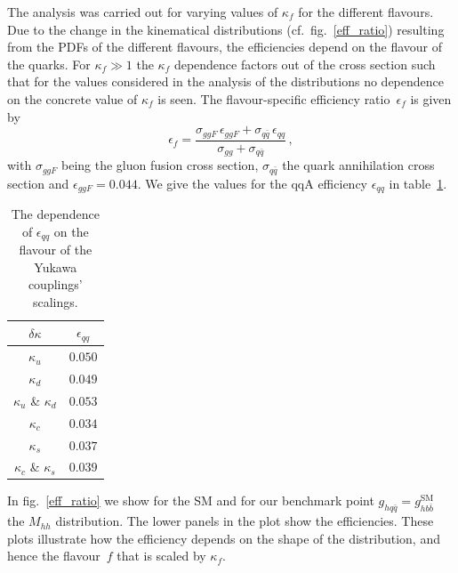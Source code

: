 %
The analysis was carried out for varying values of $\kappa_f$ for the different flavours. Due to the change in the kinematical distributions (cf.~fig.~\ref{eff_ratio}) resulting from the PDFs of the different flavours, the efficiencies depend on the flavour of the quarks.
For $\kappa_f\gg 1$ the $\kappa_f$ dependence factors out of the cross section such that for the values considered in the analysis of the distributions no dependence on the concrete value of $\kappa_f$ is seen. The flavour-specific efficiency ratio~$\epsilon_f$ is given by
\begin{equation}
	\epsilon_f =  \frac{\sigma_{ggF} \, \epsilon_{ggF} + \sigma_{q\bar q}  \, \epsilon_{qq} }{\sigma_{gg} + \sigma_{q\bar q}}\,,
	\label{effrat}
\end{equation}
with $\sigma_{ggF}$ being the gluon fusion cross section, $\sigma_{q\bar q}$ the quark annihilation cross section and $\epsilon_{ggF} = 0.044$. We give the values for the qqA efficiency $\epsilon_{qq}$ in table~\ref{eps_vark}.
\begin{table}[!b]
	\centering
	\begin{tabular}{cc}
		\toprule
		$\delta \kappa$ 	& $ \epsilon_{qq}$	 \\
		\midrule
		$\kappa_{u}$   & $0.050$  \\
		$\kappa_{d}$   & $0.049$   \\
		$\kappa_{u}$ \& $\kappa_{d}$   & $0.053$  \\
		\hline
		$\kappa_{c}$   & $0.034$  \\
		$\kappa_{s}$   & $0.037$   \\
		$\kappa_{c}$ \& $\kappa_{s}$   & $0.039$  \\
		\bottomrule
	\end{tabular}
	\caption{The dependence of $\epsilon_{qq}$ on the flavour of the Yukawa couplings' scalings.}
	\label{eps_vark}
\end{table}

In fig.~\ref{eff_ratio} we show for the SM and for our benchmark point $g_{hq\bar{q}}=g_{hb\bar{b}}^{\text{SM}}$ the $M_{hh}$ distribution. The lower panels in the plot show the efficiencies. These plots illustrate how the efficiency depends on the shape of the distribution, and hence the flavour~$f$ that is scaled by $\kappa_f$.

%
